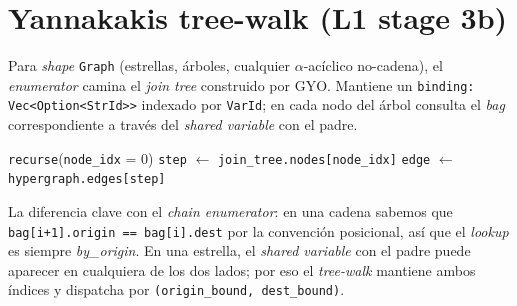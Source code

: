 \section{Yannakakis tree-walk (L1 stage 3b)}

Para \emph{shape} \texttt{Graph} (estrellas, árboles, cualquier
\(\alpha\)-acíclico no-cadena), el \emph{enumerator} camina el
\emph{join tree} construido por GYO. Mantiene un
\texttt{binding: Vec<Option<StrId>>} indexado por \texttt{VarId}; en
cada nodo del árbol consulta el \emph{bag} correspondiente a través
del \emph{shared variable} con el padre.

\begin{algorithm}[H]
\caption{Tree-walk enumerator}
\texttt{recurse}(\texttt{node\_idx} = 0)\;
\BlankLine
{}
\texttt{step} $\leftarrow$ \texttt{join\_tree.nodes[node\_idx]}\;
\texttt{edge} $\leftarrow$ \texttt{hypergraph.edges[step]}\;
\end{algorithm}

\begin{intuicion}
La diferencia clave con el \emph{chain enumerator}: en una cadena
sabemos que \texttt{bag[i+1].origin == bag[i].dest} por la convención
posicional, así que el \emph{lookup} es siempre \emph{by\_origin}. En
una estrella, el \emph{shared variable} con el padre puede aparecer
en cualquiera de los dos lados; por eso el \emph{tree-walk} mantiene
ambos índices y dispatcha por \texttt{(origin\_bound, dest\_bound)}.
\end{intuicion}
